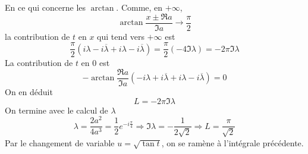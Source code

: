 En  ce qui concerne les $\arctan$.\newline
Comme, en $+\infty$, 
\begin{displaymath}
  \arctan \frac{x\pm \Re a}{\Im a} \rightarrow \frac{\pi}{2}
\end{displaymath}
la contribution de $t$ en $x$ qui tend vers $+\infty$ est
\begin{displaymath}
  \frac{\pi}{2}\left( i\lambda - i\overline{\lambda} + i\lambda - i\overline{\lambda}\right)  = 
\frac{\pi}{2}\left(-4\Im \lambda\right)  = -2\pi \Im \lambda
\end{displaymath}
La contribution de $t$ en $0$ est
\begin{displaymath}
-\arctan\frac{\Re a}{\Im a}\left( -i\lambda  + i\overline{\lambda} 
+i\lambda - i\overline{\lambda} \right) = 0
\end{displaymath}
On en déduit
\begin{displaymath}
  L = -2\pi \Im \lambda 
\end{displaymath}
On termine avec le calcul de $\lambda$ 
\begin{displaymath}
  \lambda = \frac{2a^2}{4a^3} = \frac{1}{2}e^{-i\frac{\pi}{4}}
\Rightarrow \Im \lambda = -\frac{1}{2\sqrt{2}} 
\Rightarrow L = \frac{\pi}{\sqrt{2}}
\end{displaymath}
Par le changement de variable $u=\sqrt{\tan t}$, on se ramène à l'intégrale précédente.
